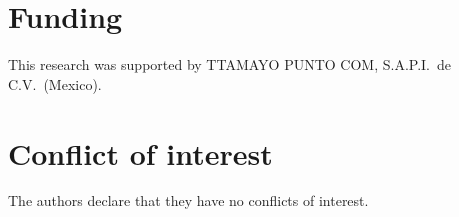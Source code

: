 \section*{Funding}\label{sec:funding}

This research was supported by TTAMAYO PUNTO COM, S.A.P.I.\
de C.V.\
(Mexico).

\section*{Conflict of interest}\label{sec:coi}

The authors declare that they have no conflicts of interest.
